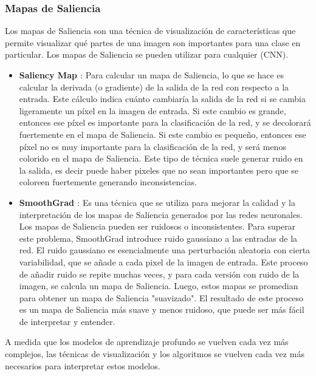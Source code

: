 \documentclass[10pt,a4paper,twocolumn,twoside]{article}
\begin{document}
\subsubsection{Mapas de Saliencia}

Los mapas de Saliencia son una técnica de visualización de características que permite visualizar qué partes de una imagen son importantes para una clase en particular. Los mapas de Saliencia se pueden utilizar para cualquier (CNN).\\

\begin{itemize}
    \item \textbf{Saliency Map \cite{SalencyMap}}: Para calcular un mapa de Saliencia, lo que se hace es calcular la derivada (o gradiente) de la salida de la red con respecto a la entrada. Este cálculo indica cuánto cambiaría la salida de la red si se cambia ligeramente un píxel en la imagen de entrada. Si este cambio es grande,
    entonces ese píxel es importante para la clasificación de la red, y se decolorará fuertemente en el mapa de Saliencia. Si este cambio es pequeño, entonces ese píxel no es muy importante para la clasificación de la red, y será menos colorido en el mapa de Saliencia. Este tipo de técnica suele generar ruido en la salida, es decir puede haber pixeles que no sean importantes pero que se coloreen fuertemente generando inconsistencias.
    \item \textbf{SmoothGrad \cite{SmoothGrad}}: Es una técnica que se utiliza para mejorar la calidad y la interpretación de los mapas de Saliencia generados por las redes neuronales. Los mapas de Saliencia pueden ser ruidosos o inconsistentes.
    Para superar este problema, SmoothGrad introduce ruido gaussiano a las entradas de la red. El ruido gaussiano es esencialmente una perturbación aleatoria con cierta variabilidad, que se añade a cada pixel de la imagen de entrada.
    Este proceso de añadir ruido se repite muchas veces, y para cada versión con ruido de la imagen, se calcula un mapa de Saliencia. Luego, estos mapas se promedian para obtener un mapa de Saliencia "suavizado".
    El resultado de este proceso es un mapa de Saliencia más suave y menos ruidoso, que puede ser más fácil de interpretar y entender.
\end{itemize}

A medida que los modelos de aprendizaje profundo se vuelven cada vez más complejos, las técnicas de visualización y los algoritmos se vuelven cada vez más necesarios para interpretar estos modelos.
\end{document}
